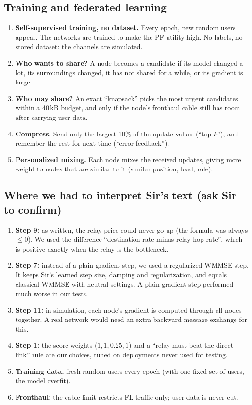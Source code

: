 \documentclass[11pt,a4paper]{article}
\begin{document}
\subsection*{Training and federated learning}
\begin{enumerate}[label=\textbf{Step \arabic*.},leftmargin=4em,start=11]
\item \textbf{Self-supervised training, no dataset.} Every epoch, new random users appear. The networks are
  trained to make the PF utility high. No labels, no stored dataset: the channels are simulated.
\item[\textbf{Step 12}] \textbf{Who wants to share?} A node becomes a candidate if its model changed a lot, its
  surroundings changed, it has not shared for a while, or its gradient is large.
\item[\textbf{Step 13}] \textbf{Who may share?} An exact ``knapsack'' picks the most urgent candidates within a
  40\,kB budget, and only if the node's fronthaul cable still has room after carrying user data.
\item[\textbf{Step 14}] \textbf{Compress.} Send only the largest 10\% of the update values (``top-$k$''), and
  remember the rest for next time (``error feedback'').
\item[\textbf{Step 15}] \textbf{Personalized mixing.} Each node mixes the received updates, giving more weight to
  nodes that are similar to it (similar position, load, role).
\end{enumerate}

\subsection*{Where we had to interpret Sir's text (ask Sir to confirm)}
\begin{enumerate}
\item \textbf{Step 9:} as written, the relay price could never go up (the formula was always $\le 0$). We used the
  difference ``destination rate minus relay-hop rate'', which is positive exactly when the relay is the bottleneck.
\item \textbf{Step 7:} instead of a plain gradient step, we used a regularized WMMSE step. It keeps Sir's learned
  step size, damping and regularization, and equals classical WMMSE with neutral settings. A plain gradient step
  performed much worse in our tests.
\item \textbf{Step 11:} in simulation, each node's gradient is computed through all nodes together. A real network
  would need an extra backward message exchange for this.
\item \textbf{Step 1:} the score weights ($1, 1, 0.25, 1$) and a ``relay must beat the direct link'' rule are our
  choices, tuned on deployments never used for testing.
\item \textbf{Training data:} fresh random users every epoch (with one fixed set of users, the model overfit).
\item \textbf{Fronthaul:} the cable limit restricts FL traffic only; user data is never cut.
\end{enumerate}
\end{document}

